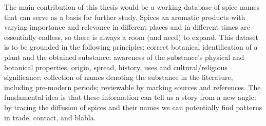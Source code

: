 































The main contribution of this thesis would be a working database of spice names that can serve as a basis for further study. Spices an aromatic products with varying importance and relevance in different places and in different times are essentially endless, so there is always a room (and need) to expand. This dataset is to be grounded in the following principles: correct botanical identification of a plant and the obtained substance; awareness of the substance's physical and botanical properties, origin, spread, history, uses and cultural/religious significance; collection of names denoting the substance in the literature, including pre-modern periods; reviewable by marking sources and references. The fundamental idea is that these information can tell us a story from a new angle: by tracing the diffusion of spices and their names we can potentially find patterns in trade, contact, and blabla. 

